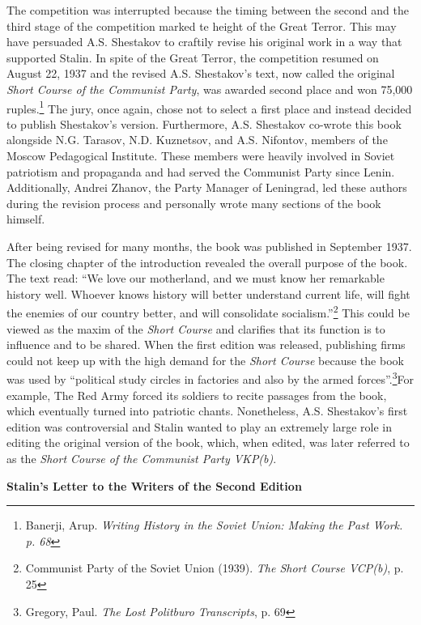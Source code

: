 \documentclass[a4paper, twocolumn]{article}
\begin{document}
The competition was interrupted because the timing between the second
and the third stage of the competition marked te height of the Great
Terror. This may have persuaded A.S. Shestakov to craftily revise his
original work in a way that supported Stalin. In spite of the Great
Terror, the competition resumed on August 22, 1937 and the revised
A.S. Shestakov's text, now called the original \emph{Short Course of the
Communist Party}, was awarded second place and won 75,000 ruples.\footnote{Banerji, Arup. \emph{Writing History in the Soviet Union: Making the Past Work. p.  68}}
The jury, once again, chose not to select a first place and instead
decided to publish Shestakov’s version. Furthermore, A.S. Shestakov
co-wrote this book alongside N.G. Tarasov, N.D. Kuznetsov, and
A.S. Nifontov, members of the Moscow Pedagogical Institute. These
members were heavily involved in Soviet patriotism and propaganda and
had served the Communist Party since Lenin. Additionally, Andrei
Zhanov, the Party Manager of Leningrad, led these authors during the
revision process and personally wrote many sections of the book
himself.

After being revised for many months, the book was published in
September 1937.  The closing chapter of the introduction revealed the
overall purpose of the book.  The text read: ``We love our motherland,
and we must know her remarkable history well. Whoever knows history
will better understand current life, will fight the enemies of our
country better, and will consolidate socialism.''\footnote{Communist Party of the Soviet Union (1939). \emph{The Short Course VCP(b)}, p. 25} This could be
viewed as the maxim of the \emph{Short Course} and clarifies that its
function is to influence and to be shared. When the first edition was
released, publishing firms could not keep up with the high demand for
the \emph{Short Course} because the book was used by “political study circles
in factories and also by the armed forces”.\footnote{Gregory, Paul. \emph{The Lost Politburo Transcripts}, p. 69}For example, The Red
Army forced its soldiers to recite passages from the book, which
eventually turned into patriotic chants. Nonetheless, A.S. Shestakov’s
first edition was controversial and Stalin wanted to play an extremely
large role in editing the original version of the book, which, when
edited, was later referred to as the \emph{Short Course of the Communist
Party VKP(b)}.


\begin{center}\textbf{Stalin's Letter to the Writers of the Second Edition}\end{center}
\end{document}
